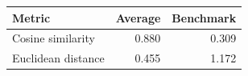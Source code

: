 
\begin{tabular}{lrr}
\toprule
Metric & Average & Benchmark\\
\midrule
Cosine similarity & 0.880 & 0.309\\
Euclidean distance & 0.455 & 1.172\\
\bottomrule
\end{tabular}
